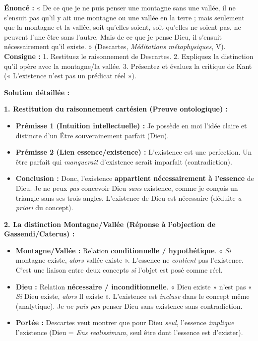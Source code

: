 \documentclass[11pt]{article}
\newcommand{\cle}[1]{{\popxbold\color{popdark}#1}}
\begin{document}
\begin{exoresolu}
\textbf{Énoncé :} « De ce que je ne puis penser une montagne sans une vallée, il ne s'ensuit pas qu'il y ait une montagne ou une vallée en la terre ; mais seulement que la montagne et la vallée, soit qu'elles soient, soit qu'elles ne soient pas, ne peuvent l'une être sans l'autre. Mais de ce que je pense Dieu, il s'ensuit nécessairement qu'il existe. » (Descartes, \emph{Méditations métaphysiques}, V).
\textbf{Consigne :} 1. Restituez le raisonnement de Descartes. 2. Expliquez la distinction qu'il opère avec la montagne/la vallée. 3. Présentez et évaluez la critique de Kant (« L'existence n'est pas un prédicat réel »).

\tcblower
\textbf{Solution détaillée :}

\textbf{1. Restitution du raisonnement cartésien (Preuve ontologique) :}
\begin{itemize}
    \item \textbf{Prémisse 1 (Intuition intellectuelle) :} Je possède en moi l'idée claire et distincte d'un \cle{Être souverainement parfait} (Dieu).
    \item \textbf{Prémisse 2 (Lien essence/existence) :} L'\cle{existence} est une \cle{perfection}. Un être parfait qui \emph{manquerait} d'existence serait imparfait (contradiction).
    \item \textbf{Conclusion :} Donc, l'existence \textbf{appartient nécessairement à l'essence} de Dieu. Je ne peux \emph{pas} concevoir Dieu \emph{sans} existence, comme je conçois un triangle sans ses trois angles. L'existence de Dieu est \cle{nécessaire} (déduite \emph{a priori} du concept).
\end{itemize}

\textbf{2. La distinction Montagne/Vallée (Réponse à l'objection de Gassendi/Caterus) :}
\begin{itemize}
    \item \textbf{Montagne/Vallée :} Relation \textbf{conditionnelle / hypothétique}. « \emph{Si} montagne existe, \emph{alors} vallée existe ». L'essence ne \emph{contient} pas l'existence. C'est une liaison entre deux concepts \emph{si} l'objet est posé comme réel.
    \item \textbf{Dieu :} Relation \textbf{nécessaire / inconditionnelle}. « Dieu existe » n'est pas « \emph{Si} Dieu existe, \emph{alors} Il existe ». L'existence est \emph{incluse} dans le concept même (analytique). Je \emph{ne puis pas} penser Dieu sans existence sans contradiction.
    \item \textbf{Portée :} Descartes veut montrer que pour Dieu \emph{seul}, l'essence \emph{implique} l'existence (Dieu = \emph{Ens realissimum}, seul être dont l'essence est d'exister).
\end{itemize}


\end{exoresolu}
\end{document}
